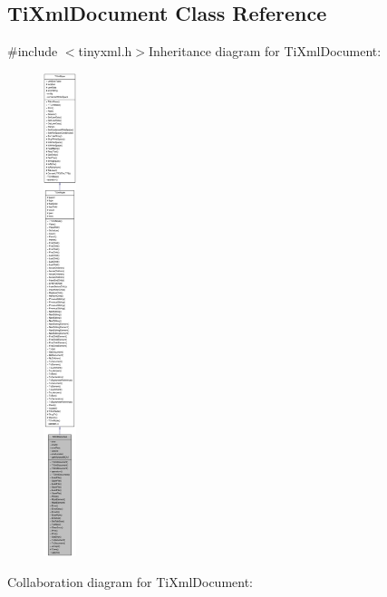 \hypertarget{class_ti_xml_document}{
\subsection{TiXmlDocument Class Reference}
\label{class_ti_xml_document}
}


{\ttfamily \#include $<$tinyxml.h$>$}Inheritance diagram for TiXmlDocument:\nopagebreak
\begin{figure}[H]
\begin{center}
\leavevmode
\includegraphics[height=400pt]{class_ti_xml_document__inherit__graph}
\end{center}
\end{figure}
Collaboration diagram for TiXmlDocument:\nopagebreak
